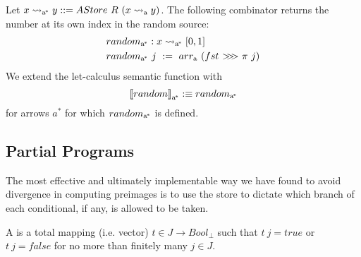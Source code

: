 \documentclass[preprint]{sigplanconf}
\newcommand{\arrow}{\rightsquigarrow}
\newcommand{\arrowarr}{\ensuremath{arr}}
\newcommand{\arrowcomp}{\ensuremath{{>}\mspace{-6mu}{>}\mspace{-6mu}{>}}}
\newcommand{\gen}{_\mathrm{a}}
\newcommand{\genc}{_\mathrm{a^{\mspace{-2mu}*}}}
\begin{document}
Let $x \arrow\genc y ::= AStore~R~(x \arrow\gen y)$.
The following combinator returns the number at its own index in the random source:
\begin{equation}
\begin{aligned}
	&random\genc : x \arrow\genc [0,1] \\
	&random\genc~j \ := \ \arrowarr\gen~(fst~\arrowcomp~\pi~j)
\end{aligned}
\end{equation}
We extend the let-calculus semantic function with
\begin{equation}
	\meaningof{random}\genc :\equiv random\genc
\end{equation}
for arrows $a^*$ for which $random\genc$ is defined.

\subsection{Partial Programs}

The most effective and ultimately implementable way we have found to avoid divergence in computing preimages is to use the store to dictate which branch of each conditional, if any, is allowed to be taken.

\begin{definition}
A  is a total mapping (i.e. vector) $t \in J \to Bool_\bot$ such that $t~j = true$ or $t~j = false$ for no more than finitely many $j \in J$.
\end{definition}
\end{document}
